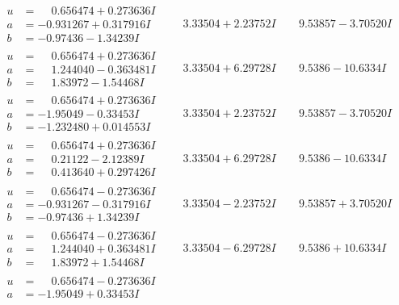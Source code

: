 \documentclass[1p]{elsarticle_modified}
\theoremstyle{definition}
\begin{document}
$$\begin{array}{c|c|c}
\begin{aligned}
u &= \phantom{-}0.656474 + 0.273636 I \\
a &= -0.931267 + 0.317916 I \\
b &= -0.97436 - 1.34239 I\end{aligned}
 & \phantom{-}3.33504 + 2.23752 I & \phantom{-}9.53857 - 3.70520 I \\ \hline\begin{aligned}
u &= \phantom{-}0.656474 + 0.273636 I \\
a &= \phantom{-}1.244040 - 0.363481 I \\
b &= \phantom{-}1.83972 - 1.54468 I\end{aligned}
 & \phantom{-}3.33504 + 6.29728 I & \phantom{-}9.5386 - 10.6334 I \\ \hline\begin{aligned}
u &= \phantom{-}0.656474 + 0.273636 I \\
a &= -1.95049 - 0.33453 I \\
b &= -1.232480 + 0.014553 I\end{aligned}
 & \phantom{-}3.33504 + 2.23752 I & \phantom{-}9.53857 - 3.70520 I \\ \hline\begin{aligned}
u &= \phantom{-}0.656474 + 0.273636 I \\
a &= \phantom{-}0.21122 - 2.12389 I \\
b &= \phantom{-}0.413640 + 0.297426 I\end{aligned}
 & \phantom{-}3.33504 + 6.29728 I & \phantom{-}9.5386 - 10.6334 I \\ \hline\begin{aligned}
u &= \phantom{-}0.656474 - 0.273636 I \\
a &= -0.931267 - 0.317916 I \\
b &= -0.97436 + 1.34239 I\end{aligned}
 & \phantom{-}3.33504 - 2.23752 I & \phantom{-}9.53857 + 3.70520 I \\ \hline\begin{aligned}
u &= \phantom{-}0.656474 - 0.273636 I \\
a &= \phantom{-}1.244040 + 0.363481 I \\
b &= \phantom{-}1.83972 + 1.54468 I\end{aligned}
 & \phantom{-}3.33504 - 6.29728 I & \phantom{-}9.5386 + 10.6334 I \\ \hline\begin{aligned}
u &= \phantom{-}0.656474 - 0.273636 I \\
a &= -1.95049 + 0.33453 I \\

\end{aligned}
\end{array}$$
\end{document}
